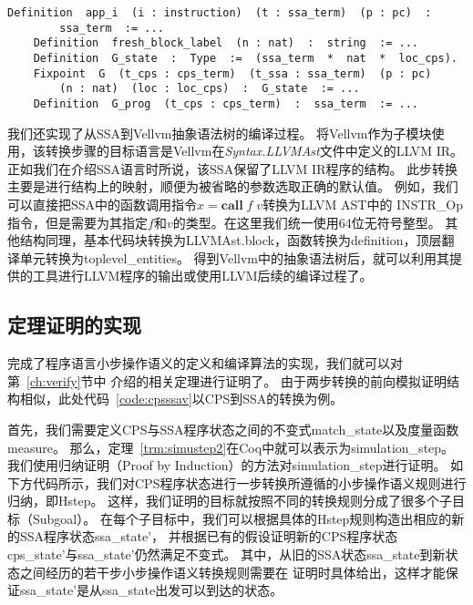 \vspace{1ex}
\begin{lstlisting}[language=Coq, caption=Coq中CPS到SSA的转换算法, label=code:cpsssa]  
    Definition  app_i  (i : instruction)  (t : ssa_term)  (p : pc)  : 
        ssa_term  := ... 
    Definition  fresh_block_label  (n : nat)  :  string  := ...
    Definition  G_state  :  Type  :=  (ssa_term  *  nat  *  loc_cps).
    Fixpoint  G  (t_cps : cps_term)  (t_ssa : ssa_term)  (p : pc)  
        (n : nat)  (loc : loc_cps)  :  G_state  := ...
    Definition  G_prog  (t_cps : cps_term)  :  ssa_term  := ...
\end{lstlisting}

我们还实现了从SSA到Vellvm抽象语法树的编译过程。
将Vellvm作为子模块使用，该转换步骤的目标语言是Vellvm在\textit{Syntax.LLVMAst}文件中定义的LLVM IR。
正如我们在介绍SSA语言时所说，该SSA保留了LLVM IR程序的结构。
此步转换主要是进行结构上的映射，顺便为被省略的参数选取正确的默认值。
例如，我们可以直接把SSA中的函数调用指令$x = \mathbf{call}\; f\; v$转换为LLVM AST中的
INSTR\_Op指令，但是需要为其指定$f$和$v$的类型。在这里我们统一使用64位无符号整型。
其他结构同理，基本代码块转换为LLVMAst.block，函数转换为definition，顶层翻译单元转换为toplevel\_entities。
得到Vellvm中的抽象语法树后，就可以利用其提供的工具进行LLVM程序的输出或使用LLVM后续的编译过程了。

\subsection{定理证明的实现} \label{sec:implthm}

完成了程序语言小步操作语义的定义和编译算法的实现，我们就可以对第~\ref{ch:verify}节中
介绍的相关定理进行证明了。
由于两步转换的前向模拟证明结构相似，此处代码~\ref{code:cpsssav}以CPS到SSA的转换为例。

首先，我们需要定义CPS与SSA程序状态之间的不变式match\_state以及度量函数measure。
那么，定理~\ref{trm:simustep2}在Coq中就可以表示为simulation\_step。
我们使用归纳证明（Proof by Induction）的方法对simulation\_step进行证明。
如下方代码所示，我们对CPS程序状态进行一步转换所遵循的小步操作语义规则进行归纳，即Hstep。
这样，我们证明的目标就按照不同的转换规则分成了很多个子目标（Subgoal）。
在每个子目标中，我们可以根据具体的Hstep规则构造出相应的新的SSA程序状态ssa\_state'，
并根据已有的假设证明新的CPS程序状态cps\_state'与ssa\_state'仍然满足不变式。
其中，从旧的SSA状态ssa\_state到新状态之间经历的若干步小步操作语义转换规则需要在
证明时具体给出，这样才能保证ssa\_state'是从ssa\_state出发可以到达的状态。

